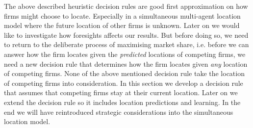 \documentclass[preprint, 12pt]{elsarticle}
\begin{document}
The above described heuristic decision rules are good first approximation on how firms might choose to locate. Especially in a simultaneous multi-agent location model where the future location of other firms is unknown. Later on we would like to investigate how foresights affects our results. But before doing so, we need to return to the deliberate process of maximising market share, i.e. before we can answer how the firm locates given the \emph{predicted} locations of competing firms, we need a new decision rule that determines how the firm locates given \emph{any} location of competing firms. None of the above mentioned decision rule take the location of competing firms into consideration. In this section we develop a decision rule that assumes that competing firms stay at their current location. Later on we extend the decision rule so it includes location predictions and learning. In the end we will have reintroduced strategic considerations into the simultaneous location model.
\end{document}
